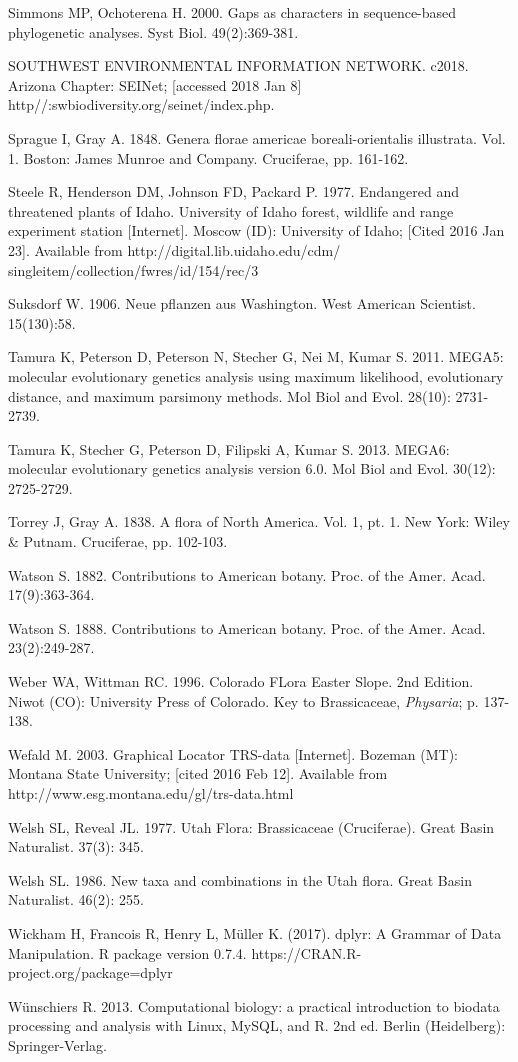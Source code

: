 Simmons MP, Ochoterena H. 2000. Gaps as characters in sequence-based phylogenetic analyses. Syst Biol. 49(2):369-381.

SOUTHWEST ENVIRONMENTAL INFORMATION NETWORK. c2018. Arizona Chapter: SEINet; [accessed 2018 Jan 8] http//:swbiodiversity.org/seinet/index.php.

Sprague I, Gray A. 1848. Genera florae americae boreali-orientalis illustrata.  Vol. 1. Boston: James Munroe and Company. Cruciferae, pp. 161-162.  

Steele R, Henderson DM, Johnson FD, Packard P. 1977. Endangered and threatened plants of Idaho. University of Idaho forest, wildlife and range experiment station [Internet]. Moscow (ID): University of Idaho; [Cited 2016 Jan 23]. Available from http://digital.lib.uidaho.edu/cdm/ singleitem/collection/fwres/id/154/rec/3

Suksdorf W. 1906. Neue pflanzen aus Washington. West American Scientist. 15(130):58.

Tamura K, Peterson D, Peterson N, Stecher G, Nei M, Kumar S. 2011. MEGA5: molecular evolutionary genetics analysis using maximum likelihood, evolutionary distance, and maximum parsimony methods. Mol Biol and Evol. 28(10): 2731-2739.

Tamura K, Stecher G, Peterson D, Filipski A, Kumar S. 2013. MEGA6: molecular evolutionary genetics analysis version 6.0. Mol Biol and Evol. 30(12): 2725-2729.

Torrey J, Gray A. 1838. A flora of North America. Vol. 1, pt. 1. New York: Wiley \& Putnam. Cruciferae, pp. 102-103.
  
Watson S. 1882. Contributions to American botany. Proc. of the Amer. Acad. 17(9):363-364.

Watson S. 1888. Contributions to American botany. Proc. of the Amer. Acad. 23(2):249-287.

Weber WA, Wittman RC. 1996. Colorado FLora Easter Slope. 2nd Edition. Niwot (CO): University Press of Colorado. Key to Brassicaceae, \textit{Physaria}; p. 137-138.

Wefald M. 2003. Graphical Locator TRS-data [Internet]. Bozeman (MT): Montana State University; [cited 2016 Feb 12]. Available from http://www.esg.montana.edu/gl/trs-data.html

Welsh SL, Reveal JL. 1977. Utah Flora: Brassicaceae (Cruciferae). Great Basin Naturalist. 37(3): 345.

Welsh SL. 1986. New taxa and combinations in the Utah flora. Great Basin Naturalist. 46(2): 255.

Wickham H, Francois R, Henry L, Müller K. (2017). dplyr: A Grammar of Data Manipulation. R package version 0.7.4. https://CRAN.R-project.org/package=dplyr

Wünschiers R. 2013. Computational biology: a practical introduction to biodata processing and analysis with Linux, MySQL, and R. 2nd ed. Berlin (Heidelberg): Springer-Verlag.

\setlength{\parindent}{0em}
\setlength{\leftskip}{0em}
\setlength{\parskip}{6pt}
\doublespacing
